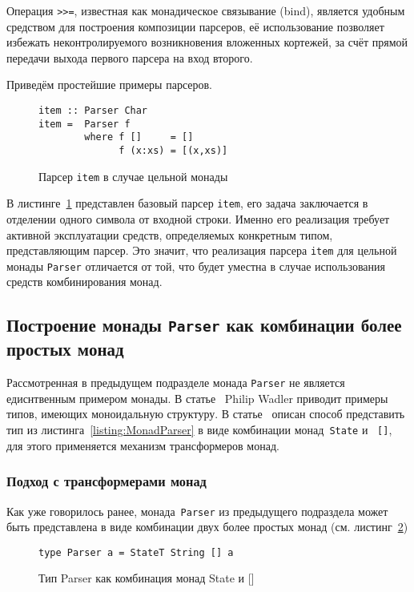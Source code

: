 Операция \lstinline{>>=}, известная как монадическое связывание (bind), является удобным средством для построения композиции парсеров, её использование позволяет избежать неконтролируемого возникновения вложенных кортежей, за счёт прямой передачи выхода первого парсера на вход второго. 

Приведём простейшие примеры парсеров. 

\begin{figure}[h]
  \begin{lstlisting}
item :: Parser Char
item =  Parser f 
        where f []     = []
              f (x:xs) = [(x,xs)]
  \end{lstlisting}
  \caption{Парсер \lstinline{item} в случае цельной монады}
  \label{listing:ParserItem}
\end{figure}

В листинге~\ref{listing:ParserItem} представлен базовый парсер \lstinline{item}, его задача заключается в отделении одного символа от входной строки. Именно его реализация требует активной эксплуатации средств, определяемых конкретным типом, представляющим парсер. Это значит, что реализация парсера \lstinline{item} для цельной монады \lstinline{Parser} отличается от той, что будет уместна в случае использования средств комбинирования монад.

\subsection{Построение монады \lstinline{Parser} как комбинации более простых монад}

Рассмотренная в предыдущем подразделе монада \lstinline{Parser} не является едиснтвенным примером монады. В статье~\autocite{WadlerMonads} Philip Wadler приводит примеры типов, имеющих моноидальную структуру. В статье~\autocite{MonParsing} описан способ представить тип из листинга~\ref{listing:MonadParser} в виде комбинации монад~\lstinline{State} и ~\lstinline{[]}, для этого применяется механизм трансформеров монад. 

\subsubsection{Подход с трансформерами монад}

Как уже говорилось ранее, монада~\lstinline{Parser} из предыдущего подраздела может быть представлена в виде комбинации двух более простых монад (см. листинг~\ref{listing:MonadTransParser})

\begin{figure}[h]
\begin{lstlisting}
type Parser a = StateT String [] a
\end{lstlisting}
\caption{Тип Parser как комбинация монад State и []}
\label{listing:MonadTransParser}
\end{figure}

